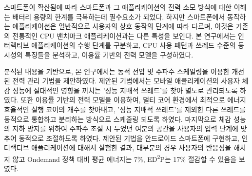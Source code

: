 \begin{summary}

스마트폰이 확산됨에 따라 스마트폰과 그 애플리케이션의 전력 소모 방식에 대한 이해는 
배터리 용량의 한계를 극복하는데 필수요소가 되었다. 
하지만 스마트폰에서 동작하는 애플리케이션은 일반적으로 사용자의 상호 동작의 단계에 따라 다르며, 
이것은 기존의 전통적인 CPU 밴치마크 애플리케이션과는 다른 특성을 보인다. 
본 연구에서는 인터랙티브 애플리케이션의 수행 단계를 구분하고, CPU 사용 패턴과 쓰레드 수준의 동시성의 특징들을 분석하고, 이용률 기반의 전력 모델을 구성하였다.

분석된 내용을 기반으로, 본 연구에서는 동적 전압 및 주파수 스케일링을 이용한 개선된 전력 관리 기법을 제안하였다. 
제안된 기법에서는 모바일 애플리케이션의 사용자 체감 성능에 절대적인 영향을 끼치는 '성능 지배적 쓰레드'를 찾아 별도로 관리되도록 하였다. 
또한 이용률 기반의 전력 모델을 이용하여, 멀티 코어 환경에서 최적으로 에너지 효율적인 실행 코어의 개수를 찾아내고, 
'성능 지배적 쓰레드'를 제외한 다른 쓰레드를 동적으로 통합하고 분리하는 방식으로 스케줄링 되도록 하였다. 
마지막으로 체감 성능의 저하 방지를 위하여 주파수 조절 시 두었던 여분의 공간을 사용자의 입력 단계에 맞추어 동적으로 조절하도록 하였다. 
제안된 기법을 안드로이드 스마트폰에 구현하고, 인터랙티브 애플리케이션에 대해서 실험한 결과, 
대부분의 경우 사용자의 반응성을 해치지 않고 Ondemand 정책 대비 평균 에너지는 7\%, ED\textsuperscript{2}P는 17\% 절감할 수 있음을 보였다.
\end{summary}
